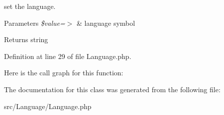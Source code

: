 set the language.


\begin{DoxyParams}{Parameters}
{\em \$value=$>$} & language symbol\\
\hline
\end{DoxyParams}
\begin{DoxyReturn}{Returns}
string 
\end{DoxyReturn}


Definition at line 29 of file Language.\+php.

Here is the call graph for this function\+:


The documentation for this class was generated from the following file\+:\begin{DoxyCompactItemize}
\item 
src/\+Language/Language.\+php\end{DoxyCompactItemize}
